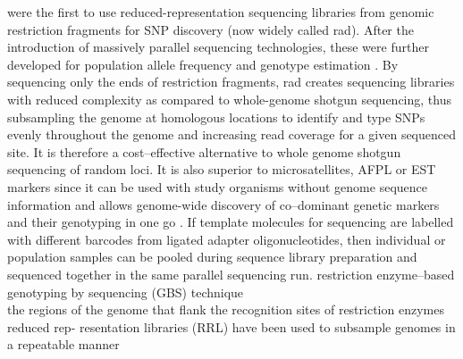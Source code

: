\documentclass[a4paper,12pt,times,print,index,custombib,custommargin]{PhDThesisPSnPDF}\usepackage[]{graphicx}\usepackage[]{color}
\begin{document}
\cite{Altshuler2000} were the first to use reduced-representation sequencing libraries from genomic restriction fragments for SNP discovery (now widely called \gls{rad}). After the introduction of massively parallel sequencing technologies, these were further developed for population allele frequency and genotype estimation \citep{Baird2008,VanTassell2008,Andolfatto2011,Elshire2011,Davey2011}.  By sequencing only the ends of restriction fragments, \gls{rad} creates sequencing libraries with reduced complexity as compared to whole-genome shotgun sequencing, thus subsampling the genome at homologous locations to identify and type SNPs evenly throughout the genome and increasing \gls{read} coverage for a given sequenced site. It is therefore a cost--effective alternative to whole genome shotgun sequencing of random loci. It is also superior to microsatellites, AFPL or EST markers since it can be used with study organisms without genome sequence information and allows genome-wide discovery of co--dominant genetic markers and their genotyping in one go \citep{Davey2011}. If template molecules for sequencing are labelled with different \glspl{barcode} from ligated adapter oligonucleotides, then individual or population samples can be pooled during sequence library preparation and sequenced together in the same parallel sequencing run. restriction enzyme--based genotyping by sequencing (GBS) technique \\
the regions of the genome that flank the recognition sites of restriction enzymes \\
reduced rep- resentation libraries (RRL) have been used to subsample genomes in a repeatable manner
\end{document}
